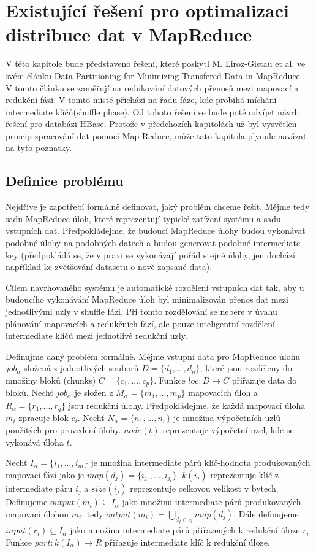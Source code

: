 \documentclass[thesis=M,czech]{FITthesis}[2012/06/26]
\begin{document}
\chapter{Existující řešení pro optimalizaci distribuce dat v MapReduce}
V této kapitole bude představeno řešení, které poskytl M. Liroz-Gistau et al. ve svém článku Data Partitioning for Minimizing Transfered Data in MapReduce \cite{gistau}. V tomto článku se zaměřují na redukování datových přenosů mezi mapovací a redukční fází. V tomto místě přichází na řadu fáze, kde probíhá míchání intermediate klíčů(shuffle phase). Od tohoto řešení se bude poté odvíjet návrh řešení pro databázi HBase. Protože v předchozích kapitolách už byl vysvětlen princip zpracování dat pomocí Map Reduce, může tato kapitola plynule navázat na tyto poznatky. 

\section{Definice problému}
Nejdříve je zapotřebí formálně definovat, jaký problém chceme řešit. Mějme tedy sadu MapReduce úloh, které reprezentují typické zatížení systému a sadu vstupních dat. Předpokládejme, že budoucí MapReduce úlohy budou vykonávat podobné úlohy na podobných datech a budou generovat podobné intermediate key (předpokládá se, že v praxi se vykonávají pořád stejné úlohy, jen dochází například ke zvětšování datasetu o nově zapsané data). 

Cílem navrhovaného systému je automatické rozdělení vstupních dat tak, aby u budoucího vykonávání MapReduce úloh byl minimalizován přenos dat mezi jednotlivými uzly v shuffle fázi. Při tomto rozdělování se nebere v úvahu plánování mapovacích a redukčních fází, ale pouze inteligentní rozdělení intermediate klíčů mezi jednotlivé redukční uzly.

	Definujme daný problém formálně. Mějme vstupní data pro MapReduce úlohu $job_\alpha$ složená z jednotlivých souborů $D = \{d_1, ..., d_n\}$, které jsou rozděleny do  množiny bloků (chunks) $C = \{c_1, ..., c_p\}$. Funkce $loc : D \rightarrow C$ přiřazuje data do bloků. Nechť  $job_\alpha$ je složen z $M_\alpha = \{m_1, ..., m_p\}$ mapovacích úloh a $R_\alpha = \{r_1, ..., r_q\}$ jsou redukční úlohy. Předpokládejme, že každá mapovací úloha $m_i$ zpracuje blok $c_i$. Nechť  $N_\alpha = \{n_1, ..., n_s\}$ je množina výpočetních uzlů použitých pro provedení úlohy. $node(t)$ reprezentuje výpočetní uzel, kde se vykonává úloha $t$.

Nechť $I_\alpha = \{i_1, ..., i_m\}$ je množina intermediate párů klíč-hodnota produkovaných mapovací fází jako je $map(d_j) = \{i_{j_1}, ..., i_{j_t}\}$. $k(i_j)$ reprezentuje klíč z intermediate páru $i_j$ a $size(i_j)$ reprezentuje celkovou velikost v bytech. Definujeme $output(m_i) \subseteq I_\alpha$ jako množinu intermediate párů produkovaných mapovací úlohou $m_i$, tedy $output(m_i) = \bigcup_{{d_j}\in{c_i}} map(d_j)$. Dále definujeme $input(r_i)\subseteq I_\alpha$ jako množinu intermediate párů přiřazených k redukční úloze $r_i$. Funkce $part : k(I_\alpha) \rightarrow R$ přiřazuje intermediate klíč k redukční úloze. 
\end{document}
